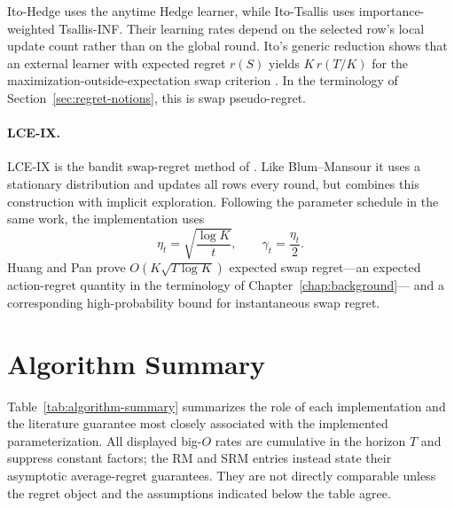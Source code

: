 Ito-Hedge uses the anytime Hedge learner, while Ito-Tsallis uses
importance-weighted Tsallis-INF. Their learning rates depend on the selected
row's local update count rather than on the global round. Ito's generic
reduction shows that an external learner with expected regret \(r(S)\) yields
\(K\,r(T/K)\) for the maximization-outside-expectation swap criterion
\citep{ito_tight_2020}. In the terminology of
Section~\ref{sec:regret-notions}, this is swap pseudo-regret.

\paragraph{LCE-IX.}

LCE-IX is the bandit swap-regret method of
\citet{huang_near-optimal_2023}. Like Blum--Mansour it uses a stationary
distribution and updates all rows every round, but combines this construction
with implicit exploration. Following the parameter schedule in the same work, the implementation uses
\[
    \eta_t=\sqrt{\frac{\log K}{t}},
    \qquad
    \gamma_t=\frac{\eta_t}{2}.
\]
Huang and Pan prove \(O(K\sqrt{T\log K})\) expected swap regret---an expected
action-regret quantity in the terminology of Chapter~\ref{chap:background}---
and a corresponding high-probability bound for instantaneous swap regret.

\section{Algorithm Summary}
\label{sec:algorithm-summary}

Table~\ref{tab:algorithm-summary} summarizes the role of each implementation
and the literature guarantee most closely associated with the implemented
parameterization. All displayed big-$O$ rates are cumulative in the horizon $T$ and
suppress constant factors; the RM and SRM entries instead state their
asymptotic average-regret guarantees. They are not directly comparable unless the regret
object and the assumptions indicated below the table agree.

